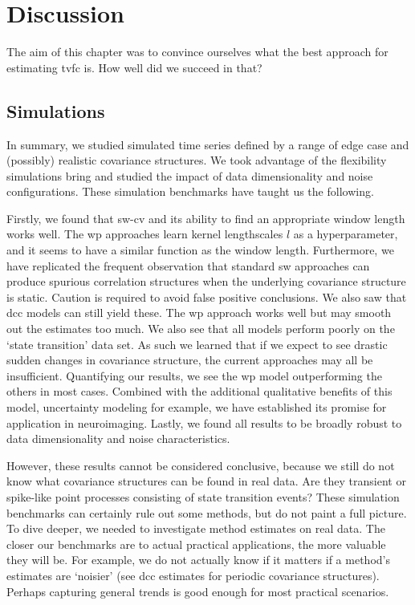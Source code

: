 \clearpage
\section{Discussion}

The aim of this chapter was to convince ourselves what the best approach for estimating \gls{tvfc} is.
How well did we succeed in that?

\subsection{Simulations}

In summary, we studied simulated time series defined by a range of edge case and (possibly) realistic covariance structures.
We took advantage of the flexibility simulations bring and studied the impact of data dimensionality and noise configurations.
These simulation benchmarks have taught us the following.

Firstly, we found that \gls{sw-cv} and its ability to find an appropriate window length works well.
The \gls{wp} approaches learn kernel lengthscales $l$ as a hyperparameter, and it seems to have a similar function as the window length.
%
Furthermore, we have replicated the frequent observation that standard \gls{sw} approaches can produce spurious correlation structures when the underlying covariance structure is static.
Caution is required to avoid false positive conclusions.
We also saw that \gls{dcc} models can still yield these.
%
The \gls{wp} approach works well but may smooth out the estimates too much.
We also see that all models perform poorly on the `state transition' data set.
As such we learned that if we expect to see drastic sudden changes in covariance structure, the current approaches may all be insufficient.
%
Quantifying our results, we see the \gls{wp} model outperforming the others in most cases.
Combined with the additional qualitative benefits of this model, uncertainty modeling for example, we have established its promise for application in neuroimaging.
%
Lastly, we found all results to be broadly robust to data dimensionality and noise characteristics.

However, these results cannot be considered conclusive, because we still do not know what covariance structures can be found in real data.
Are they transient or spike-like point processes consisting of state transition events?
These simulation benchmarks can certainly rule out some methods, but do not paint a full picture.
%
To dive deeper, we needed to investigate method estimates on real data.
The closer our benchmarks are to actual practical applications, the more valuable they will be.
For example, we do not actually know if it matters if a method's estimates are `noisier' (see \gls{dcc} estimates for periodic covariance structures).
Perhaps capturing general trends is good enough for most practical scenarios.

